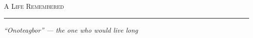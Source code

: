 

%
%


\vspace*{\fill}

\begin{center}
  {\Large\scshape\color{primary} A Life Remembered}

  \vspace{3mm}
  {\color{rulecolor}\rule{18mm}{0.4pt}}

  \vspace{4mm}
  \begin{minipage}{0.84\linewidth}
    \centering\small\itshape\color{accent}
    ``Onoteagbor'' --- the one who would live long
  \end{minipage}
\end{center}

\vspace*{6mm}

\newpage

%

